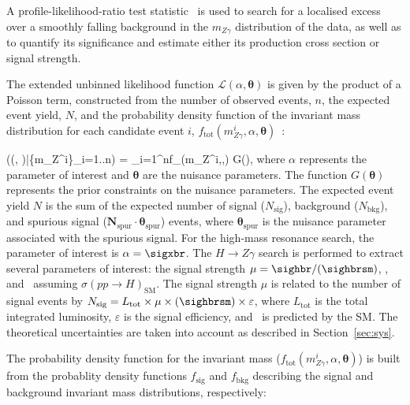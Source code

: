 A profile-likelihood-ratio test statistic~\cite{stat} is used to search for
a localised excess over a smoothly falling background in the $m_{Z\gamma}$ distribution
of the data, as well as to quantify its significance and estimate either its
production cross section or signal strength.

The extended unbinned likelihood function $\mathcal{L}(\alpha, \boldsymbol{\theta})$ is given by the
product of a Poisson term, constructed from the number of observed events, $n$,
the expected event yield, $N$, and the probability density function
 of the invariant mass distribution for each candidate event $i$, 
$f_\mathrm{tot}(m_{Z\gamma}^{i}, \alpha,\boldsymbol{\theta})$~\cite{Aaboud:2016trl}:

\beq
\LL\left((\alpha, \boldsymbol{\theta})\Big|\{m_{Z\gamma}^i\}_{i=1..n}\right) =  \prod\limits_{i=1}^nf_(m_{Z\gamma}^i,\alpha,\boldsymbol{\theta}) \times G(\boldsymbol{\theta}),
\eeq
where $\alpha$ represents the parameter of interest and 
$\boldsymbol{\theta}$ are the nuisance parameters. The function $G(\boldsymbol{\theta})$ 
represents the prior constraints on the nuisance parameters.
The expected event yield $N$ is the sum 
of the expected number of signal ($N_{\mathrm{sig}}$), background ($N_{\mathrm{bkg}}$), and
spurious signal ($\boldsymbol{N_\mathrm{spur}}\cdot\boldsymbol{\theta_\mathrm{spur}}$) events, where
$\boldsymbol{\theta_\mathrm{spur}}$ is the nuisance parameter associated with the spurious signal.
For the high-mass resonance search, the parameter of interest is $\alpha=\sigxbr$. 
The $H\to Z\gamma$ search is performed to extract several parameters of interest:
the signal strength $\mu = \sighbr / (\sighbrsm)$,
\sighbr, and \brhzg~assuming $\sigma(pp\to H)_\mathrm{SM}$. 
The signal strength $\mu$ is related to the number of signal events by
$N_{\mathrm{sig}} = L_\mathrm{tot} \times \mu \times (\sighbrsm) \times \varepsilon$, where 
$L_\mathrm{tot}$ is the total integrated luminosity, $\varepsilon$
is the signal efficiency, and  \sighbrsm~is predicted by the SM.
The theoretical uncertainties are
taken into account as described in Section~\ref{sec:sys}.

The probability density function for the invariant mass
($f_\mathrm{tot}(m_{Z\gamma}^{i}, \alpha,\boldsymbol{\theta})$) is built from the probablity 
density functions $f_\mathrm{sig}$ and $f_\mathrm{bkg}$
describing the signal and background invariant mass distributions, respectively:
%

